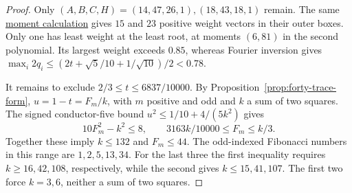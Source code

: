 \documentclass[11pt,reqno]{amsart}
\newcommand{\codecheck}[2]{\href{https://github.com/sebastienpalcoux/grothendieck-ring-classification/blob/d5750105bb5758f3ad38d2e5464dfcc12c019816/supplements/rank6/sphericality/#1}{#2}}
\theoremstyle{remark}\newtheorem{remark}[theorem]{Remark}
\numberwithin{equation}{section}
\begin{document}
\begin{proof}
Only $(A,B,C,H)=(14,47,26,1),(18,43,18,1)$ remain. The same
\codecheck{quartic_more/silvergold.py}{moment calculation} gives
$15$ and $23$ positive weight vectors in their outer boxes. Only
one has least weight at the least root, at moments $(6,81)$ in the
second polynomial. Its largest weight exceeds $0.85$, whereas Fourier
inversion gives $\max_i 2q_i\le(2t+\sqrt5/10+1/\sqrt{10})/2<0.78$.

It remains to exclude $2/3\le t\le6837/10000$. By
Proposition~\ref{prop:forty-trace-form}, $u=1-t=F_m/k$, with $m$
positive and odd and $k$ a sum of two squares. The signed conductor-five
bound $u^2\le1/10+4/(5k^2)$ gives
\[
  10F_m^2-k^2\le8,\qquad 3163k/10000\le F_m\le k/3 .
\]
Together these imply $k\le132$ and $F_m\le44$. The odd-indexed
Fibonacci numbers in this range are $1,2,5,13,34$. For the last
three the first inequality requires $k\ge16,42,108$, respectively,
while the second gives $k\le15,41,107$. The first two force $k=3,6$,
neither a sum of two squares.
\end{proof}
\end{document}
